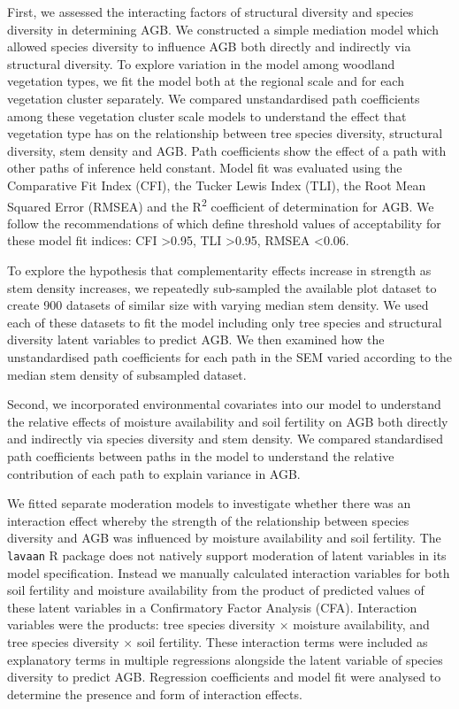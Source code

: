 \documentclass[11pt,a4paper]{article}
\begin{document}
First, we assessed the interacting factors of structural diversity and species diversity in determining AGB. We constructed a simple mediation model which allowed species diversity to influence AGB both directly and indirectly via structural diversity. To explore variation in the model among woodland vegetation types, we fit the model both at the regional scale and for each vegetation cluster separately. We compared unstandardised path coefficients among these vegetation cluster scale models to understand the effect that vegetation type has on the relationship between tree species diversity, structural diversity, stem density and AGB. Path coefficients show the effect of a path with other paths of inference held constant. Model fit was evaluated using the Comparative Fit Index (CFI), the Tucker Lewis Index (TLI), the Root Mean Squared Error (RMSEA) and the R\textsuperscript{2} coefficient of determination for AGB. We follow the recommendations of \citet{Hu1999} which define threshold values of acceptability for these model fit indices: CFI >0.95, TLI >0.95, RMSEA <0.06.

To explore the hypothesis that complementarity effects increase in strength as stem density increases, we repeatedly sub-sampled the available plot dataset to create 900 datasets of similar size with varying median stem density. We used each of these datasets to fit the model including only tree species and structural diversity latent variables to predict AGB. We then examined how the unstandardised path coefficients for each path in the SEM varied according to the median stem density of subsampled dataset.

Second, we incorporated environmental covariates into our model to understand the relative effects of moisture availability and soil fertility on AGB both directly and indirectly via species diversity and stem density. We compared standardised path coefficients between paths in the model to understand the relative contribution of each path to explain variance in AGB.

We fitted separate moderation models to investigate whether there was an interaction effect whereby the strength of the relationship between species diversity and AGB was influenced by moisture availability and soil fertility. The \verb|lavaan| R package does not natively support moderation of latent variables in its model specification. Instead we manually calculated interaction variables for both soil fertility and moisture availability from the product of predicted values of these latent variables in a Confirmatory Factor Analysis (CFA). Interaction variables were the products: tree species diversity $\times$ moisture availability, and tree species diversity $\times$ soil fertility. These interaction terms were included as explanatory terms in multiple regressions alongside the latent variable of species diversity to predict AGB. Regression coefficients and model fit were analysed to determine the presence and form of interaction effects.
\end{document}
